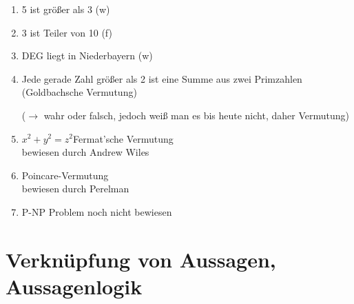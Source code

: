 \Bsps
\begin{enumerate}
	\item 5 ist größer als 3 (w)
	\item 3 ist Teiler von 10 (f)
	\item DEG liegt in Niederbayern (w)
	\item Jede gerade Zahl größer als 2 ist eine Summe aus zwei Primzahlen (Goldbachsche Vermutung)
	
	($\rightarrow$ wahr oder falsch, jedoch weiß man es bis heute nicht, daher {\flqq Vermutung\frqq})
	
	\item $x^2+y^2=z^2$\hfill Fermat'sche {\flqq Vermutung\frqq}\\
	bewiesen durch Andrew Wiles
	
	\item Poincare-Vermutung\\
	bewiesen durch Perelman
	
	\item P-NP Problem
	noch nicht bewiesen
\end{enumerate}

\clearpage
\section{Verknüpfung von Aussagen, Aussagenlogik}

